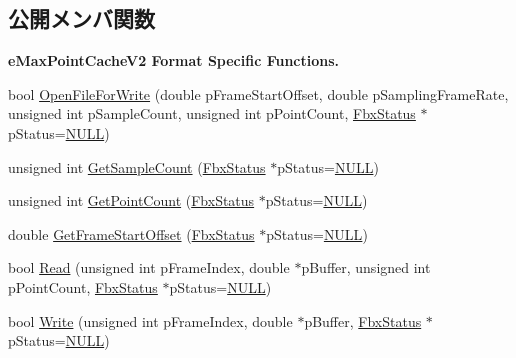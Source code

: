 \subsection*{公開メンバ関数}
\begin{Indent}\textbf{ e\+Max\+Point\+Cache\+V2 Format Specific Functions.}\par
\begin{DoxyCompactItemize}
\item 
bool \hyperlink{class_fbx_cache_a94fc2a702ee5c53cd41938c54cd4befd}{Open\+File\+For\+Write} (double p\+Frame\+Start\+Offset, double p\+Sampling\+Frame\+Rate, unsigned int p\+Sample\+Count, unsigned int p\+Point\+Count, \hyperlink{class_fbx_status}{Fbx\+Status} $\ast$p\+Status=\hyperlink{fbxarch_8h_a070d2ce7b6bb7e5c05602aa8c308d0c4}{N\+U\+LL})
\item 
unsigned int \hyperlink{class_fbx_cache_a1aaeb41671716ea531a0b6402c59c878}{Get\+Sample\+Count} (\hyperlink{class_fbx_status}{Fbx\+Status} $\ast$p\+Status=\hyperlink{fbxarch_8h_a070d2ce7b6bb7e5c05602aa8c308d0c4}{N\+U\+LL})
\item 
unsigned int \hyperlink{class_fbx_cache_a944e876d22843e5aec776cf9c11d80ad}{Get\+Point\+Count} (\hyperlink{class_fbx_status}{Fbx\+Status} $\ast$p\+Status=\hyperlink{fbxarch_8h_a070d2ce7b6bb7e5c05602aa8c308d0c4}{N\+U\+LL})
\item 
double \hyperlink{class_fbx_cache_a73f12c006cfc12b696785c00df3fee58}{Get\+Frame\+Start\+Offset} (\hyperlink{class_fbx_status}{Fbx\+Status} $\ast$p\+Status=\hyperlink{fbxarch_8h_a070d2ce7b6bb7e5c05602aa8c308d0c4}{N\+U\+LL})
\item 
bool \hyperlink{class_fbx_cache_a91700888943ba42ce063617516f1159d}{Read} (unsigned int p\+Frame\+Index, double $\ast$p\+Buffer, unsigned int p\+Point\+Count, \hyperlink{class_fbx_status}{Fbx\+Status} $\ast$p\+Status=\hyperlink{fbxarch_8h_a070d2ce7b6bb7e5c05602aa8c308d0c4}{N\+U\+LL})
\item 
bool \hyperlink{class_fbx_cache_ac83fc721f7eb4dbcb09dbb13efea76ce}{Write} (unsigned int p\+Frame\+Index, double $\ast$p\+Buffer, \hyperlink{class_fbx_status}{Fbx\+Status} $\ast$p\+Status=\hyperlink{fbxarch_8h_a070d2ce7b6bb7e5c05602aa8c308d0c4}{N\+U\+LL})
\end{DoxyCompactItemize}
\end{Indent}

